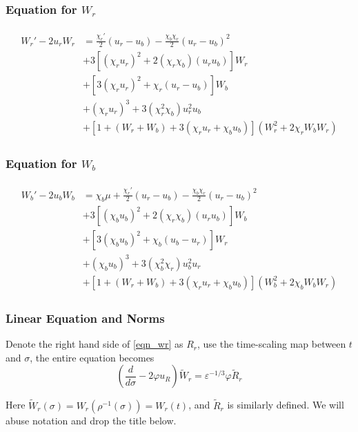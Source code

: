 \documentclass[letterpaper,11pt]{article}
\newcommand{\eps}{\varepsilon}
\numberwithin{equation}{section}
\theoremstyle{plain}
\begin{document}
\begin{itemize}
\subsubsection{Equation for \texorpdfstring{$W_r$}{Wr}}
\begin{align}\label{eqn_wr}
\begin{split}
W_r' - 2u_rW_r &= \frac{\chi_r'}{2}(u_r-u_b)-\frac{\chi_b\chi_r}{2}(u_r-u_b)^2 \\
&+3[(\chi_ru_r)^2+2(\chi_r\chi_b)(u_ru_b)] W_r \\&+[3(\chi_ru_r)^2+\chi_r(u_r-u_b)]W_b 
\\&+(\chi_ru_r)^3+3(\chi_r^2\chi_b)u_r^2u_b
\\&+ [1+(W_r+W_b)+3(\chi_ru_r+\chi_bu_b)](W_r^2 + 2\chi_rW_bW_r)
\end{split}
\end{align}
\subsubsection{Equation for \texorpdfstring{$W_b$}{Wb}}
\begin{align}\label{eqn_wb}
\begin{split}
W_b' - 2u_bW_b &= \chi_b\mu+ \frac{\chi_r'}{2}(u_r-u_b)-\frac{\chi_b\chi_r}{2}(u_r-u_b)^2 
\\&+3[(\chi_bu_b)^2+2(\chi_r\chi_b)(u_ru_b)] W_b \\&+[3(\chi_bu_b)^2+\chi_b(u_b-u_r)]W_r 
\\&+(\chi_bu_b)^3+3(\chi_b^2\chi_r)u_b^2u_r
\\&+ [1+(W_r+W_b)+3(\chi_ru_r+\chi_bu_b)](W_b^2 + 2\chi_bW_bW_r)
\end{split}
\end{align}

\subsubsection{Linear Equation and Norms}
Denote the right hand side of \eqref{eqn_wr} as $R_r$, use the time-scaling map between $t$ and $\sigma$, the entire equation becomes
\begin{equation}\label{rescl_wr}
\left(\frac{d}{d\sigma} - 2\varphi u_R\right) \tilde{W}_r =\eps^{-1/3}\varphi \tilde{R}_r
\end{equation}

Here $\tilde{W}_r(\sigma) = W_r( \rho^{-1}(\sigma))=W_r(t)$, and $\tilde{R}_r$ is similarly defined. We will abuse notation and drop the title below.


\end{itemize}
\end{document}
